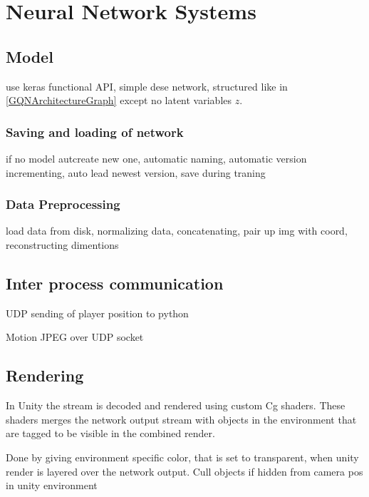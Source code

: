 
\chapter{Neural Network Systems}
\section{Model}
use keras functional API,
simple dese network,
structured like in \ref{GQNArchitectureGraph} except no latent variables $z$.



\subsection{Saving and loading of network}
if no model autcreate new one,
automatic naming,
automatic version incrementing,
auto lead newest version,
save during traning


\subsection{Data Preprocessing}
load data from disk,
normalizing data,
concatenating,
pair up img with coord,
reconstructing dimentions


\section{Inter process communication}
UDP sending of player position to python

Motion JPEG over UDP socket


\section{Rendering}
In Unity the stream is decoded and rendered using custom Cg shaders. These shaders merges the network output stream with objects in the environment that are tagged to be visible in the combined render.

Done by giving environment specific color, that is set to transparent, when unity render is layered over the network output.
Cull objects if hidden from camera pos in unity environment
